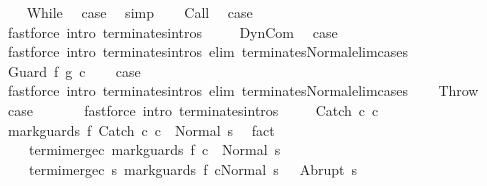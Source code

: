 \begin{isabellebody}
\isanewline
\ \ \isamarkupfalse%
\ While\ \isamarkupfalse%
\ {\isacharquery}case\ \isamarkupfalse%
\ simp\isanewline
{}\isamarkupfalse%
\isanewline
\ \ \isamarkupfalse%
\ Call\ \isamarkupfalse%
\ {\isacharquery}case\ \isanewline
\ \ \ \ \isamarkupfalse%
\ {\isacharparenleft}fastforce\ intro{\isacharcolon}\ terminates{\isachardot}intros\ {\isacharparenright}\isanewline
{}\isamarkupfalse%
\isanewline
\ \ \isamarkupfalse%
\ DynCom\ \isamarkupfalse%
\ {\isacharquery}case\ \isanewline
\ \ \ \ \isamarkupfalse%
\ {\isacharparenleft}fastforce\ intro{\isacharcolon}\ terminates{\isachardot}intros\ elim{\isacharcolon}\ terminates{\isacharunderscore}Normal{\isacharunderscore}elim{\isacharunderscore}cases{\isacharparenright}\isanewline
{}\isamarkupfalse%
\isanewline
\ \ \isamarkupfalse%
\ {\isacharparenleft}Guard\ f\ g\ c{\isacharparenright}\isanewline
\ \ \isamarkupfalse%
\ {\isacharquery}case\ \isamarkupfalse%
\ {\isacharparenleft}fastforce\ intro{\isacharcolon}\ terminates{\isachardot}intros\ elim{\isacharcolon}\ terminates{\isacharunderscore}Normal{\isacharunderscore}elim{\isacharunderscore}cases{\isacharparenright}\isanewline
{}\isamarkupfalse%
\isanewline
\ \ \isamarkupfalse%
\ Throw\ \isamarkupfalse%
\ {\isacharquery}case\ \isanewline
\ \ \ \ \isamarkupfalse%
\ {\isacharparenleft}fastforce\ intro{\isacharcolon}\ terminates{\isachardot}intros\ {\isacharparenright}\isanewline
{}\isamarkupfalse%
\isanewline
\ \ \isamarkupfalse%
\ {\isacharparenleft}Catch\ c{}\ c{}{\isacharparenright}\ \isanewline
\ \ \isamarkupfalse%
\ {\isachardoublequoteopen}{\isasymGamma}{\isasymturnstile}mark{\isacharunderscore}guards\ f\ {\isacharparenleft}Catch\ c{}\ c{}{\isacharparenright}\ {\isasymdown}\ Normal\ s{\isachardoublequoteclose}\ \isamarkupfalse%
\ fact\isanewline
\ \ \isamarkupfalse%
\ \isamarkupfalse%
\isanewline
\ \ \ \ termi{\isacharunderscore}merge{\isacharunderscore}c{}{\isacharcolon}\ {\isachardoublequoteopen}{\isasymGamma}{\isasymturnstile}mark{\isacharunderscore}guards\ f\ c{}\ {\isasymdown}\ Normal\ s{\isachardoublequoteclose}\ \isanewline
\ \ \ \ termi{\isacharunderscore}merge{\isacharunderscore}c{}{\isacharcolon}\ {\isachardoublequoteopen}{\isasymforall}s{\isacharprime}{\isachardot}\ {\isasymGamma}{\isasymturnstile}{\isasymlangle}mark{\isacharunderscore}guards\ f\ c{}{\isacharcomma}Normal\ s\ {\isasymrangle}\ {\isasymRightarrow}\ Abrupt\ s{\isacharprime}\ {\isasymlongrightarrow}\ \isanewline

\end{isabellebody}
